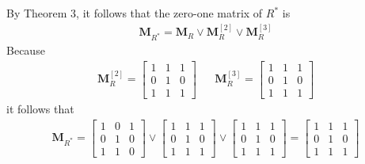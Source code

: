 \documentclass{report}
\begin{document}
\sol
By Theorem 3, it follows that the zero-one matrix of $R^*$ is
\begin{align*}
    \boldsymbol{M}_{R^*}=\boldsymbol{M}_R \vee \boldsymbol{M}_R^{[2]} \vee \boldsymbol{M}_R^{[3]}
\end{align*}
Because
\begin{align*}
    \boldsymbol{M}_R^{[2]}=
    \begin{bmatrix}
        1 & 1 & 1\\
        0 & 1 & 0\\
        1 & 1 & 1
    \end{bmatrix}&&
    \boldsymbol{M}_R^{[3]}=
    \begin{bmatrix}
        1 & 1 & 1\\
        0 & 1 & 0\\
        1 & 1 & 1
    \end{bmatrix}
\end{align*}
it follows that
\begin{align*}
    \boldsymbol{M}_{R^*}=
    \begin{bmatrix}
        1 & 0 & 1\\
        0 & 1 & 0\\
        1 & 1 & 0
    \end{bmatrix}\vee
    \begin{bmatrix}
        1 & 1 & 1\\
        0 & 1 & 0\\
        1 & 1 & 1
    \end{bmatrix}\vee
    \begin{bmatrix}
        1 & 1 & 1\\
        0 & 1 & 0\\
        1 & 1 & 1
    \end{bmatrix}=
    \begin{bmatrix}
        1 & 1 & 1\\
        0 & 1 & 0\\
        1 & 1 & 1
    \end{bmatrix}
\end{align*}
\end{document}
